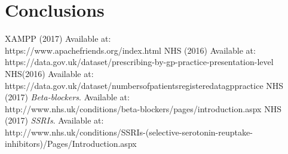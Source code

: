 \documentclass{report}
\begin{document}
\chapter{Conclusions}

\lstlistoflistings
{}
\begin{thebibliography}{9}
		XAMPP (2017)
		Available at: \\https://www.apachefriends.org/index.html
		NHS (2016)
		Available at: \\https://data.gov.uk/dataset/prescribing-by-gp-practice-presentation-level
		NHS(2016)
		Available at: \\{https://data.gov.uk/dataset/numbers\textunderscore of\textunderscore patients\textunderscore registered\textunderscore at\textunderscore a\textunderscore gp\textunderscore practice}
		NHS (2017)
		\textit{Beta-blockers}.
		Available at: \\{http://www.nhs.uk/conditions/beta-blockers/pages/introduction.aspx}
		NHS (2017)
		\textit{SSRIs}.
		Available at: \\{http://www.nhs.uk/conditions/SSRIs-(selective-serotonin-reuptake-inhibitors)/Pages/Introduction.aspx}
\end{thebibliography}
\end{document}
